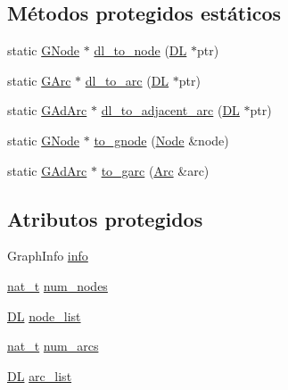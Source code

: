 \subsection*{Métodos protegidos estáticos}
\begin{DoxyCompactItemize}
\item 
static \hyperlink{class_designar_1_1_digraph_a33b0d2b8820ada501522b0e67e63524a}{G\+Node} $\ast$ \hyperlink{class_designar_1_1_digraph_adbb91274c17d6087fdd5721e3f9b1f7c}{dl\+\_\+to\+\_\+node} (\hyperlink{class_designar_1_1_d_l}{DL} $\ast$ptr)
\item 
static \hyperlink{class_designar_1_1_digraph_a341acf8fb0195a8986158c29c4db1a89}{G\+Arc} $\ast$ \hyperlink{class_designar_1_1_digraph_af9581e9d0825da11ce153bd055149f7f}{dl\+\_\+to\+\_\+arc} (\hyperlink{class_designar_1_1_d_l}{DL} $\ast$ptr)
\item 
static \hyperlink{class_designar_1_1_digraph_a0c6d846f23d1e82556fb6055557df53f}{G\+Ad\+Arc} $\ast$ \hyperlink{class_designar_1_1_digraph_afe3162bf2e56b177e7ee1a938ae2af8b}{dl\+\_\+to\+\_\+adjacent\+\_\+arc} (\hyperlink{class_designar_1_1_d_l}{DL} $\ast$ptr)
\item 
static \hyperlink{class_designar_1_1_digraph_a33b0d2b8820ada501522b0e67e63524a}{G\+Node} $\ast$ \hyperlink{class_designar_1_1_digraph_ae0a945e347e8e6a15df21df4fe2c1782}{to\+\_\+gnode} (\hyperlink{class_designar_1_1_digraph_a4dc921c41a480b7946a04170e997d8ae}{Node} \&node)
\item 
static \hyperlink{class_designar_1_1_digraph_a0c6d846f23d1e82556fb6055557df53f}{G\+Ad\+Arc} $\ast$ \hyperlink{class_designar_1_1_digraph_a6137e6849dcb4208e9c8daa26f303868}{to\+\_\+garc} (\hyperlink{class_designar_1_1_digraph_a0ceb278671f2a535c00fddccdeafd69f}{Arc} \&arc)
\end{DoxyCompactItemize}
\subsection*{Atributos protegidos}
\begin{DoxyCompactItemize}
\item 
Graph\+Info \hyperlink{class_designar_1_1_digraph_aec655bb1b26775cb7ad3581240290efe}{info}
\item 
\hyperlink{namespace_designar_aa72662848b9f4815e7bf31a7cf3e33d1}{nat\+\_\+t} \hyperlink{class_designar_1_1_digraph_a468cec4048ff9042a288dca47ad856aa}{num\+\_\+nodes}
\item 
\hyperlink{class_designar_1_1_d_l}{DL} \hyperlink{class_designar_1_1_digraph_ac81c264dab34ca74fc62b0693c1c3543}{node\+\_\+list}
\item 
\hyperlink{namespace_designar_aa72662848b9f4815e7bf31a7cf3e33d1}{nat\+\_\+t} \hyperlink{class_designar_1_1_digraph_accd2da6bdb5bc0624e7f79c904c89328}{num\+\_\+arcs}
\item 
\hyperlink{class_designar_1_1_d_l}{DL} \hyperlink{class_designar_1_1_digraph_ad860dbe9732bc90906a486cad390637a}{arc\+\_\+list}
\end{DoxyCompactItemize}
